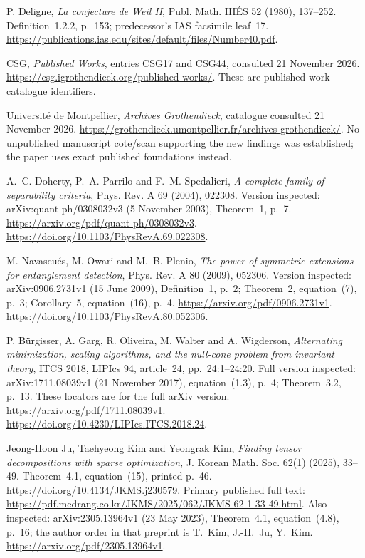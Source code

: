 P. Deligne,
\emph{La conjecture de Weil II},
Publ. Math. IH\'ES 52 (1980), 137--252.
Definition~1.2.2, p.~153; predecessor's IAS facsimile leaf~17.
\url{https://publications.ias.edu/sites/default/files/Number40.pdf}.

CSG,
\emph{Published Works}, entries CSG17 and CSG44,
consulted 21 November 2026.
\url{https://csg.igrothendieck.org/published-works/}.
These are published-work catalogue identifiers.

Universit\'e de Montpellier,
\emph{Archives Grothendieck}, catalogue consulted
21 November 2026.
\url{https://grothendieck.umontpellier.fr/archives-grothendieck/}.
No unpublished manuscript cote/scan supporting the new findings
was established; the paper uses exact published foundations instead.


A.~C. Doherty, P.~A. Parrilo and F.~M. Spedalieri,
\emph{A complete family of separability criteria},
Phys. Rev. A 69 (2004), 022308.
Version inspected: arXiv:quant-ph/0308032v3 (5 November 2003),
Theorem~1, p.~7.
\url{https://arxiv.org/pdf/quant-ph/0308032v3}.
\url{https://doi.org/10.1103/PhysRevA.69.022308}.

M. Navascu\'es, M. Owari and M.~B. Plenio,
\emph{The power of symmetric extensions for entanglement detection},
Phys. Rev. A 80 (2009), 052306.
Version inspected: arXiv:0906.2731v1 (15 June 2009),
Definition~1, p.~2; Theorem~2, equation~(7), p.~3;
Corollary~5, equation~(16), p.~4.
\url{https://arxiv.org/pdf/0906.2731v1}.
\url{https://doi.org/10.1103/PhysRevA.80.052306}.

P. B\"urgisser, A. Garg, R. Oliveira, M. Walter and A. Wigderson,
\emph{Alternating minimization, scaling algorithms, and the null-cone
problem from invariant theory},
ITCS 2018, LIPIcs 94, article~24, pp.~24:1--24:20.
Full version inspected: arXiv:1711.08039v1 (21 November 2017),
equation~(1.3), p.~4; Theorem~3.2, p.~13.
These locators are for the full arXiv version.
\url{https://arxiv.org/pdf/1711.08039v1}.
\url{https://doi.org/10.4230/LIPIcs.ITCS.2018.24}.

Jeong-Hoon Ju, Taehyeong Kim and Yeongrak Kim,
\emph{Finding tensor decompositions with sparse optimization},
J. Korean Math. Soc. 62(1) (2025), 33--49.
Theorem~4.1, equation~(15), printed p.~46.
\url{https://doi.org/10.4134/JKMS.j230579}.
Primary published full text:
\url{https://pdf.medrang.co.kr/JKMS/2025/062/JKMS-62-1-33-49.html}.
Also inspected: arXiv:2305.13964v1 (23 May 2023),
Theorem~4.1, equation~(4.8), p.~16;
the author order in that preprint is T.~Kim, J.-H.~Ju, Y.~Kim.
\url{https://arxiv.org/pdf/2305.13964v1}.
